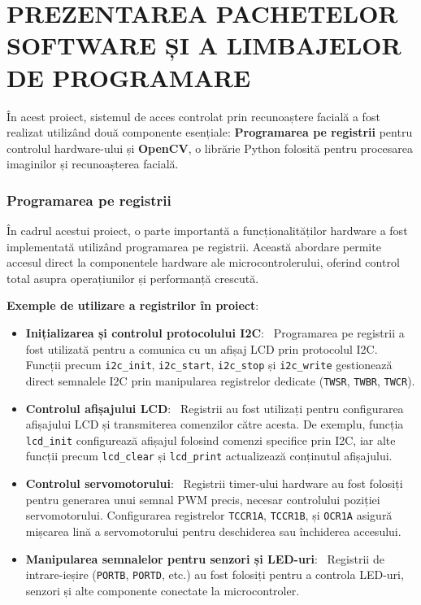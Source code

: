 \documentclass[a4paper,12pt]{report}
\begin{document}
\chapter*{PREZENTAREA PACHETELOR SOFTWARE ȘI A LIMBAJELOR DE PROGRAMARE}

În acest proiect, sistemul de acces controlat prin recunoaștere facială a fost realizat utilizând două componente esențiale: \textbf{Programarea pe registrii} pentru controlul hardware-ului și \textbf{OpenCV}, o librărie Python folosită pentru procesarea imaginilor și recunoașterea facială.

\subsection*{Programarea pe registrii}

În cadrul acestui proiect, o parte importantă a funcționalităților hardware a fost implementată utilizând programarea pe registrii. Această abordare permite accesul direct la componentele hardware ale microcontrolerului, oferind control total asupra operațiunilor și performanță crescută.

\textbf{Exemple de utilizare a registrilor în proiect}:
\begin{itemize}
    \item \textbf{Inițializarea și controlul protocolului I2C}: \
    Programarea pe registrii a fost utilizată pentru a comunica cu un afișaj LCD prin protocolul I2C. Funcții precum \texttt{i2c\_init}, \texttt{i2c\_start}, \texttt{i2c\_stop} și \texttt{i2c\_write} gestionează direct semnalele I2C prin manipularea registrelor dedicate (\texttt{TWSR}, \texttt{TWBR}, \texttt{TWCR}).

    \item \textbf{Controlul afișajului LCD}: \
    Registrii au fost utilizați pentru configurarea afișajului LCD și transmiterea comenzilor către acesta. De exemplu, funcția \texttt{lcd\_init} configurează afișajul folosind comenzi specifice prin I2C, iar alte funcții precum \texttt{lcd\_clear} și \texttt{lcd\_print} actualizează conținutul afișajului.

    \item \textbf{Controlul servomotorului}: \
    Registrii timer-ului hardware au fost folosiți pentru generarea unui semnal PWM precis, necesar controlului poziției servomotorului. Configurarea registrelor \texttt{TCCR1A}, \texttt{TCCR1B}, și \texttt{OCR1A} asigură mișcarea lină a servomotorului pentru deschiderea sau închiderea accesului.

    \item \textbf{Manipularea semnalelor pentru senzori și LED-uri}: \
    Registrii de intrare-ieșire (\texttt{PORTB}, \texttt{PORTD}, etc.) au fost folosiți pentru a controla LED-uri, senzori și alte componente conectate la microcontroler.
\end{itemize}
\end{document}
